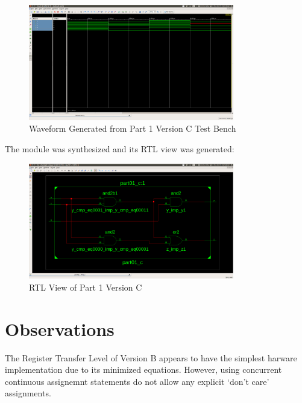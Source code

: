 \documentclass[paper=usletter, fontsize=12pt]{article}
\begin{document}
        \begin{figure}[ht]
            \begin{center}
                \includegraphics[width=0.8\textwidth]{version_c_wav.png}
                \caption{Waveform Generated from Part 1 Version C Test Bench} \label{fig:c_wav}
            \end{center}
        \end{figure}

        The module was synthesized and its RTL view was generated:
        \begin{figure}[ht]
            \begin{center}
                \includegraphics[width=0.8\textwidth]{version_c.png}
                \caption{RTL View of Part 1 Version C} \label{fig:c_rtl}
            \end{center}
        \end{figure}

    \section{Observations}
    The Register Transfer Level of Version B appears to have the simplest harware implementation due to its minimized equations. However, using concurrent continuous assignemnt statements do not allow any explicit `don't care' assignments.
\end{document}
